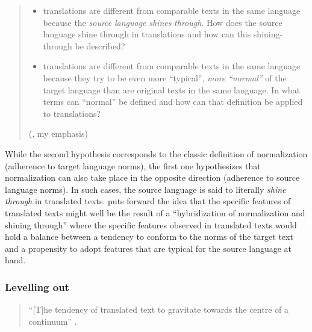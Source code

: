 \begin{quote}
\begin{itemize} 
	\item translations are different from comparable texts in the same language because the \textit{source} \textit{language} \textit{shines} \textit{through}. How does the source language shine through in translations and how can this shining-through be described?
	\item translations are different from comparable texts in the same language because they try to be even more ``typical'', \textit{more} \textit{``normal''} of the target language than are original texts in the same language. In what terms can ``normal'' be defined and how can that definition be applied to translations?
\end{itemize}
\hfill(\citealt[61--62]{teich_cross-linguistic_2003}, my emphasis)
\end{quote}

While the second hypothesis corresponds to the classic definition of normalization (adherence to target language norms), the first one hypothesizes that normalization can also take place in the opposite direction (adherence to source language norms). In such cases, the source language is said to literally \textit{shine} \textit{through} in translated texts. \citet[136]{kranich_between_2011} puts forward the idea that the specific features of translated texts might well be the result of a “hybridization of normalization and shining through” where the specific features observed in translated texts would hold a balance between a tendency to conform to the norms of the target text and a propensity to adopt features that are typical for the source language at hand.

\subsubsection{Levelling out}\largerpage
\label{sec:2.2.2.4}  
\begin{quote}
“[T]he tendency of translated text to gravitate towards the centre of a continuum” \citep[184]{baker_corpus-based_1996}.
\end{quote}

